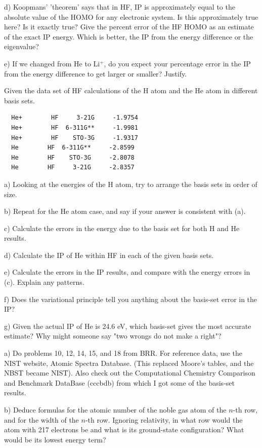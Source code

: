 d) Koopmans' 'theorem' says that in HF, IP is approximately equal to the absolute value
of the HOMO for any electronic system.  Is this approximately true here?  Is
it exactly true?  Give the percent error of the HF HOMO as an estimate
of the exact IP energy.  Which is better, the IP from the energy difference
or the eigenvalue?

e) If we changed from He to Li$^+$, do you expect your percentage error in the
IP from the energy difference to get larger or smaller?  Justify. 
\newpage
{}

Given the data set of HF calculations of the H atom and the He atom in different
basis sets.
\begin{verbatim}
  He+        HF     3-21G     -1.9754
  He+        HF  6-311G**     -1.9981
  He+        HF    STO-3G     -1.9317
  He        HF  6-311G**     -2.8599
  He        HF    STO-3G     -2.8078
  He        HF     3-21G     -2.8357
\end{verbatim}

a) Looking at the energies of the H atom, try to arrange the basis sets in order
of size.

b) Repeat for the He atom case, and say if your answer is consistent with (a).

c) Calculate the errors in the energy due to the basis set for both H and He results.

d) Calculate the IP of He within HF in each of the given basis sets.

e) Calculate the errors in the IP results, and compare with the energy errors in (c).
Explain any patterns.

f) Does the variational principle tell you anything about the basis-set error in the IP?

g) Given the actual IP of He is 24.6 eV, which basis-set gives the most accurate estimate?
Why might someone say "two wrongs do not make a right"?
\newpage
{}

a) Do problems 10, 12, 14, 15, and 18 from BRR.   For reference data, use the NIST website,
Atomic Spectra Database. (This replaced Moore's tables, and the NBST became NIST).
Also check out the Computational Chemistry Comparison and Benchmark DataBase (cccbdb)
from which I got some of the basis-set results.

b) Deduce formulas for the atomic number of the noble gas atom
of the $n$-th row, and for the width of the $n$-th row.  Ignoring
relativity, in what row would the atom with 217 electrons be and
what is its ground-state configuration?  What would be its lowest
energy term?

